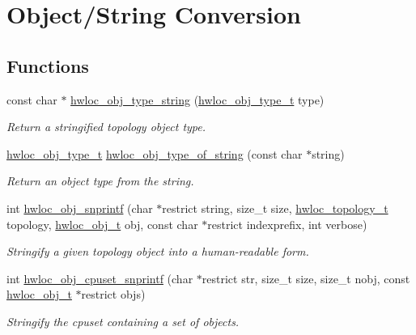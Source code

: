 \hypertarget{group__hwlocality__conversion}{
\section{Object/String Conversion}
\label{group__hwlocality__conversion}
}
\subsection*{Functions}
\begin{DoxyCompactItemize}
\item 
const char $\ast$ \hyperlink{group__hwlocality__conversion_ga5ca0bf94bbbb080d0eff17a57bd90422}{hwloc\_\-obj\_\-type\_\-string} (\hyperlink{group__hwlocality__types_gacd37bb612667dc437d66bfb175a8dc55}{hwloc\_\-obj\_\-type\_\-t} type)
\begin{DoxyCompactList}\small\item\em Return a stringified topology object type. \item\end{DoxyCompactList}\item 
\hyperlink{group__hwlocality__types_gacd37bb612667dc437d66bfb175a8dc55}{hwloc\_\-obj\_\-type\_\-t} \hyperlink{group__hwlocality__conversion_ga8a1eee67a1de115d264719157c109a20}{hwloc\_\-obj\_\-type\_\-of\_\-string} (const char $\ast$string)
\begin{DoxyCompactList}\small\item\em Return an object type from the string. \item\end{DoxyCompactList}\item 
int \hyperlink{group__hwlocality__conversion_ga612dc210053b65d2466ac7ad39db92a4}{hwloc\_\-obj\_\-snprintf} (char $\ast$restrict string, size\_\-t size, \hyperlink{group__hwlocality__topology_ga9d1e76ee15a7dee158b786c30b6a6e38}{hwloc\_\-topology\_\-t} topology, \hyperlink{structhwloc__obj}{hwloc\_\-obj\_\-t} obj, const char $\ast$restrict indexprefix, int verbose)
\begin{DoxyCompactList}\small\item\em Stringify a given topology object into a human-\/readable form. \item\end{DoxyCompactList}\item 
int \hyperlink{group__hwlocality__conversion_gae001fafdeda3a67695d406affde1ab0d}{hwloc\_\-obj\_\-cpuset\_\-snprintf} (char $\ast$restrict str, size\_\-t size, size\_\-t nobj, const \hyperlink{structhwloc__obj}{hwloc\_\-obj\_\-t} $\ast$restrict objs)
\begin{DoxyCompactList}\small\item\em Stringify the cpuset containing a set of objects. \item\end{DoxyCompactList}\end{DoxyCompactItemize}


